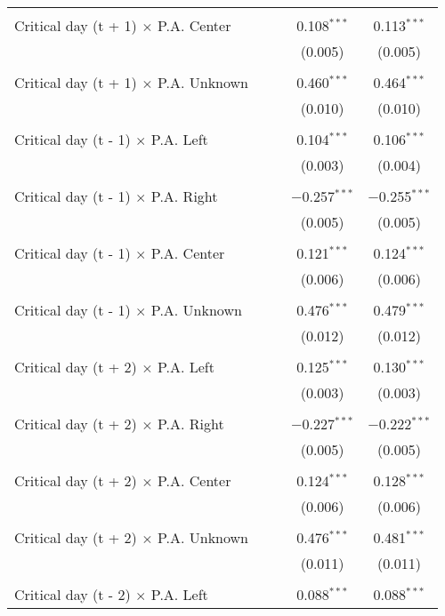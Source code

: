\documentclass[
]{article}
\begin{document}
\begin{table}[!htbp]
{\begin{tabular}{@{\extracolsep{5pt}}lcccc}
  & & & & \\ 
 Critical day (t + 1) $\times$ P.A. Center &  &  & 0.108$^{***}$ & 0.113$^{***}$ \\ 
  &  &  & (0.005) & (0.005) \\ 
  & & & & \\ 
 Critical day (t + 1) $\times$ P.A. Unknown &  &  & 0.460$^{***}$ & 0.464$^{***}$ \\ 
  &  &  & (0.010) & (0.010) \\ 
  & & & & \\ 
 Critical day (t - 1) $\times$ P.A. Left &  &  & 0.104$^{***}$ & 0.106$^{***}$ \\ 
  &  &  & (0.003) & (0.004) \\ 
  & & & & \\ 
 Critical day (t - 1) $\times$ P.A. Right &  &  & $-$0.257$^{***}$ & $-$0.255$^{***}$ \\ 
  &  &  & (0.005) & (0.005) \\ 
  & & & & \\ 
 Critical day (t - 1) $\times$ P.A. Center &  &  & 0.121$^{***}$ & 0.124$^{***}$ \\ 
  &  &  & (0.006) & (0.006) \\ 
  & & & & \\ 
 Critical day (t - 1) $\times$ P.A. Unknown &  &  & 0.476$^{***}$ & 0.479$^{***}$ \\ 
  &  &  & (0.012) & (0.012) \\ 
  & & & & \\ 
 Critical day (t + 2) $\times$ P.A. Left &  &  & 0.125$^{***}$ & 0.130$^{***}$ \\ 
  &  &  & (0.003) & (0.003) \\ 
  & & & & \\ 
 Critical day (t + 2) $\times$ P.A. Right &  &  & $-$0.227$^{***}$ & $-$0.222$^{***}$ \\ 
  &  &  & (0.005) & (0.005) \\ 
  & & & & \\ 
 Critical day (t + 2) $\times$ P.A. Center &  &  & 0.124$^{***}$ & 0.128$^{***}$ \\ 
  &  &  & (0.006) & (0.006) \\ 
  & & & & \\ 
 Critical day (t + 2) $\times$ P.A. Unknown &  &  & 0.476$^{***}$ & 0.481$^{***}$ \\ 
  &  &  & (0.011) & (0.011) \\ 
  & & & & \\ 
 Critical day (t - 2) $\times$ P.A. Left &  &  & 0.088$^{***}$ & 0.088$^{***}$ \\ 

\end{tabular}}
\end{table}
\end{document}
